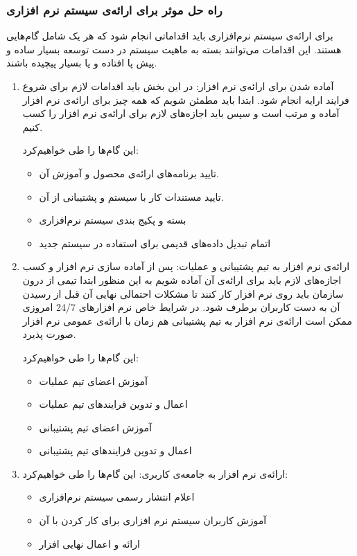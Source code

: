 \subsubsection{راه حل موثر برای ارائه‌ی سیستم نرم افزاری}
برای ارائه‌ی سیستم نرم‌افزاری باید اقداماتی انجام شود که هر یک شامل گام‌هایی هستند. این اقدامات می‌توانند بسته به ماهیت سیستم در دست توسعه بسیار ساده و پیش پا افتاده و یا بسیار پیچیده باشند.
\begin{enumerate}
\item
آماده شدن برای ارائه‌ی نرم افزار: 
\newline
در این بخش باید اقدامات لازم برای شروع فرایند ارايه انجام شود. ابتدا باید مطمئن شویم که همه چیز برای ارائه‌ی نرم افزار آماده و مرتب است و سپس باید اجازه‌‌های لازم برای ارائه‌ی نرم افزار را کسب کنیم.

این گام‌ها را طی خواهیم‌کرد:
\begin{itemize}
\item تایید برنامه‌های ارائه‌ی محصول و آموزش آن.
\item تایید مستندات کار با سیستم و پشتیبانی از آن.
\item بسته و پکیج بندی سیستم نرم‌افزاری
\item اتمام تبدیل داده‌های قدیمی برای استفاده در سیستم جدید
\end{itemize}
\item
ارائه‌ی نرم افزار به تیم پشتیبانی و عملیات:
\newline
پس از آماده سازی نرم افزار و کسب اجازه‌های لازم باید برای ارائه‌ی آن آماده شویم به این منظور ابتدا تیمی  از درون سازمان باید روی نرم افزار کار کنند تا مشکلات احتمالی نهایی آن قبل از رسیدن آن به دست کاربران برطرف شود. در شرایط خاص نرم افزار‌های 24/7 امروزی ممکن است ارائه‌ی نرم افزار به تیم پشتیبانی هم زمان با ارائه‌ی عمومی نرم افزار صورت پذیرد.

این گام‌ها را طی خواهیم‌کرد:
\begin{itemize}
\item آموزش اعضای تیم عملیات
\item اعمال و تدوین فرایند‌های تیم عملیات
\item آموزش اعضای تیم پشتیبانی
\item اعمال و تدوین فرایند‌های تیم پشتیبانی
\end{itemize}

\item
ارائه‌ی نرم افزار به جامعه‌ی کاربری:
\newline
این گام‌ها را طی خواهیم‌کرد:
\begin{itemize}
\item اعلام انتشار رسمی سیستم نرم‌افزاری
\item آموزش کاربران سیستم نرم افزاری برای کار کردن با آن
\item ارائه و اعمال نهایی افزار
\end{itemize}

\end{enumerate}

